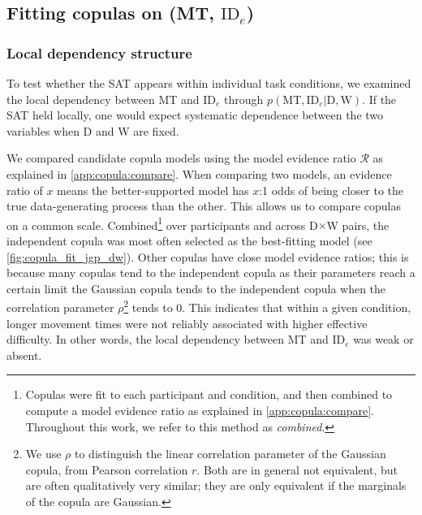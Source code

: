 \documentclass[acmlarge, manuscript,review]{acmart}
\newcommand{\mt}{\ensuremath{{\text{MT}}}\xspace}
\newcommand{\ide}{\ensuremath{{\text{ID}_e}}\xspace}
\newcommand{\D}{\ensuremath{{\text{D}}}\xspace}
\newcommand{\W}{\ensuremath{{\text{W}}}\xspace}
\begin{document}


\subsection{Fitting copulas on (MT, \ide) \label{sub:jgp::fit_copula}}

\subsubsection{Local dependency structure}
To test whether the SAT appears within individual task conditions, we examined the local dependency between MT and \ide through $p(\mt, \ide | \D, \W)$. If the SAT held locally, one would expect systematic dependence between the two variables when D and W are fixed. 

We compared candidate copula models using the model evidence ratio $\mathcal{R}$ as explained in \autoref{app:copula:compare}. 
When comparing two models, an evidence ratio of $x$ means the better-supported model has $x$:1 odds of being closer to the true data-generating process than the other. This allows us to compare copulas on a common scale.
Combined\footnote{Copulas were fit to each participant and condition, and then combined to compute a model evidence ratio as explained in \autoref{app:copula:compare}. Throughout this work, we refer to this method as \textit{combined}.} over participants and across D$\times$W pairs, the independent copula was most often selected as the best-fitting model (see %
\autoref{fig:copula_fit_jgp_dw}).
Other copulas have close model evidence ratios; this is because many copulas tend to the independent copula as their parameters reach a certain limit \eg the Gaussian copula tends to the independent copula when the correlation parameter $\rho$\footnote{We use $\rho$ to distinguish the linear correlation parameter of the Gaussian copula, from Pearson correlation $r$. Both are in general not equivalent, but are often qualitatively very similar; they are only equivalent if the marginals of the copula are Gaussian.} tends to 0.
This indicates that within a given condition, longer movement times were not reliably associated with higher effective difficulty. In other words, the local dependency between MT and \ide was weak or absent. 
\end{document}
